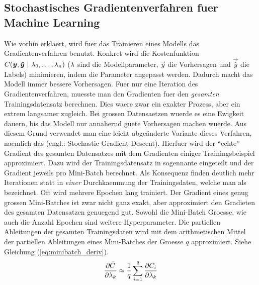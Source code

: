 


\subsection{Stochastisches Gradientenverfahren fuer Machine Learning}
Wie vorhin erklaert, wird fuer das Trainieren eines Modells das Gradientenverfahren benutzt.
Konkret wird die Kostenfunktion $C(\vec{y},\vec{\hat{y}}\ |\ \param_0,\ldots,\param_n)$
($\lambda$ sind die Modellparameter, $\vec{y}$ die Vorhersagen und $\vec{\hat{y}}$
die Labels) minimieren, indem die Parameter angepasst werden. Dadurch macht das Modell immer bessere Vorhersagen.
Fuer nur eine Iteration des Gradientenverfahren, muesste man den Gradienten fuer den
\textit{gesamten} Trainingsdatensatz berechnen.
Dies waere zwar ein exakter Prozess, aber ein extrem langsamer zugleich.
Bei grossen Datensaetzen wuerde es eine Ewigkeit dauern, bis das Modell nur annahernd guete Vorhersagen machen wuerde.
\para{}
Aus diesem Grund verwendet man eine leicht abgeänderte Variante dieses Verfahren, naemlich das  (engl.: Stochastic Gradient Descent).
Hierfuer wird der ``echte'' Gradient des gesamten Datensatzes mit dem Gradienten einiger Trainingsbeispiel approximiert.
Dazu wird der Trainingsdatensatz in sogennante  eingeteilt und der Gradient jeweils pro Mini-Batch berechnet.
Als Konsequenz finden deutlich mehr Iterationen statt in \textit{einer}
Durchkaemmung der Trainingsdaten, welche man als  bezeichnet. Oft wird mehrere Epochen lang trainiert.
Der Gradient eines genug grossen Mini-Batches ist zwar nicht ganz exakt, aber approximiert den Gradieten des gesamten Datensatzen genuegend gut.
Sowohl die Mini-Batch Groesse, wie auch die Anzahl Epochen sind weitere Hyperparameter.
\para{}
Die partiellen Ableitungen der gesamten Trainingsdaten wird mit dem arithmetischen Mittel der partiellen Ableitungen eines Mini-Batches der Groesse $q$ approximiert. Siehe Gleichung (\ref{eq:minibatch_deriv}).
\begin{equation}\label{eq:minibatch_deriv}
  \frac{\partial \bar{C}}{\partial \lambda_k} \approx \frac{1}{q}\sum_{i=1}^{q} \frac{\partial C_i}{\partial \lambda_k}
\end{equation}

